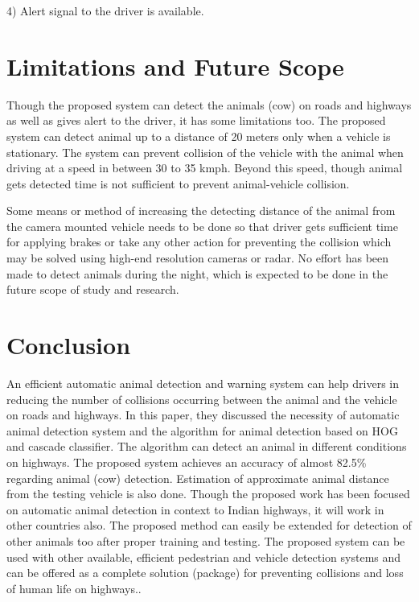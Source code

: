 \documentclass[14pt,a4paper,final]{extreport}
\begin{document}
\item 4) Alert signal to the driver is available.

\chapter{Limitations and Future Scope}
\item Though the proposed system can detect the animals (cow) on roads and highways as well as gives alert to the driver, it has some limitations too. The proposed system can detect animal up to a distance of 20 meters only when a vehicle is stationary. The system can prevent collision of the vehicle with the animal when driving at a speed in between 30 to 35 kmph. Beyond this speed, though animal gets detected time is not sufficient to prevent animal-vehicle collision.

\item Some means or method of increasing the detecting distance of the animal from the camera mounted vehicle needs to be done so that driver gets sufficient time for applying brakes or take any other action for preventing the collision which may be solved using high-end resolution cameras or radar. No effort has been made to detect animals during the night, which is expected to be done in the future scope of study and research.

\chapter{Conclusion}
An efficient automatic animal detection and warning system can help drivers in reducing the number of collisions occurring between the animal and the vehicle on roads and highways. In this paper, they discussed the necessity of automatic animal detection system and the algorithm for animal detection based on HOG and cascade classifier. The algorithm can detect an animal in different conditions on highways. The proposed system achieves an accuracy of almost 82.5\% regarding animal (cow) detection. Estimation of approximate animal distance from the testing vehicle is also done. Though the proposed work has been focused on automatic animal detection in context to Indian highways, it will work in other countries also. The proposed method can easily be extended for detection of other animals too after proper training and testing. The proposed system can be used with other available, efficient pedestrian and vehicle detection systems and can be offered as a complete solution (package) for preventing collisions and loss of human life on highways..
\end{document}
